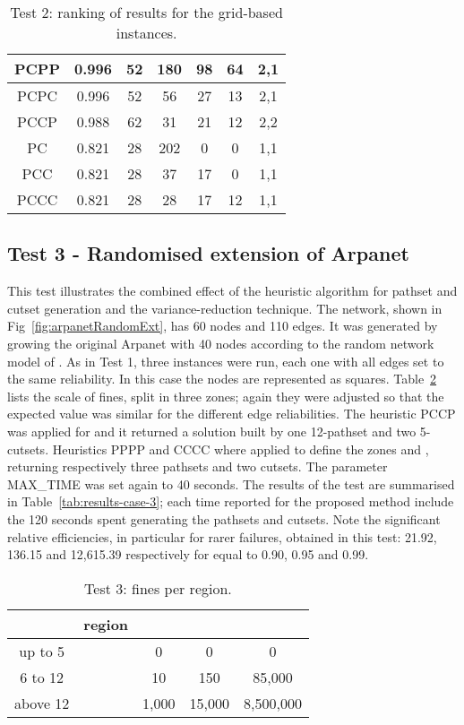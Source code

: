 \documentclass[a4paper]{article}
\begin{document}
\begin{table}
\begin{center}
\begin{tabular}{ | c | c | c | c | c | c | c | }
PCPP & 0.996 & 52 & 180 & 98 & 64 & 2,1 \\ \hline
PCPC & 0.996 & 52 & 56 & 27 & 13 & 2,1 \\ \hline
PCCP & 0.988 & 62 & 31 & 21 & 12 & 2,2 \\ \hline
PC & 0.821 & 28 & 202 & 0 & 0 & 1,1 \\ \hline
PCC & 0.821 & 28 & 37 & 17 & 0 & 1,1 \\ \hline
PCCC & 0.821 & 28 & 28 & 17 & 12 & 1,1 \\ \hline
\end{tabular}
\end{center}
\caption{Test 2: ranking of results for the grid-based instances.}
\label{tab:testSqGridsResults}
\end{table}






\subsection{Test 3 - Randomised extension of Arpanet}

This test illustrates the combined effect of the heuristic algorithm for pathset and cutset generation and the variance-reduction technique. The network, shown in Fig~\ref{fig:arpanetRandomExt}, has 60 nodes and 110 edges. It was generated by growing the original Arpanet with 40 nodes according to the random network model of \cite{AlbertBarabasi2002}. As in Test 1, three instances were run, each one with all edges set to the same reliability. In this case the nodes  are represented as squares. Table~\ref{tab:fines-3} lists the scale of fines, split in three zones; again they were adjusted so that the expected value was similar for the different edge reliabilities. The heuristic PCCP was applied for  and it returned a solution built by one 12-pathset and two 5-cutsets. Heuristics PPPP and CCCC where applied to define the zones  and , returning respectively three pathsets and two cutsets. The parameter MAX\_TIME was set again to 40 seconds. The results of the test are summarised in Table~\ref{tab:results-case-3}; each time reported for the proposed method include the 120 seconds spent generating the pathsets and cutsets. Note the significant relative efficiencies, in particular for rarer failures, obtained in this test: 21.92, 136.15 and 12,615.39 respectively for  equal to 0.90, 0.95 and 0.99.  

\begin{table}
\begin{center} \small
\begin{tabular}{ | c | c | c | c | c | }
\hline
 & region &  &  &  \\ \hline \hline
up to 5	  &   & 0 & 0 & 0 \\ \hline
6 to 12	   &  & 10 & 150 & 85,000 \\ \hline
above 12 &  & 1,000 & 15,000 & 8,500,000 \\ \hline
\end{tabular}
\end{center}
\caption{Test 3: fines per region.}
\label{tab:fines-3}
\end{table}
\end{document}
